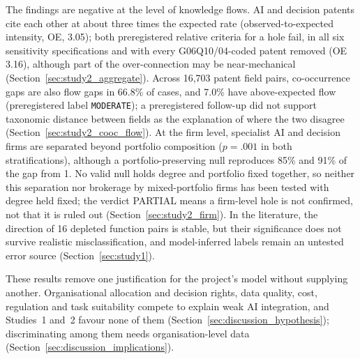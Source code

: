 The findings are negative at the level of knowledge flows. AI and decision patents cite each other at about three times the expected rate (observed-to-expected intensity, OE, 3.05); both preregistered relative criteria for a hole fail, in all six sensitivity specifications and with every G06Q10/04-coded patent removed (OE 3.16), although part of the over-connection may be near-mechanical (Section~\ref{sec:study2_aggregate}). Across 16,703 patent field pairs, co-occurrence gaps are also flow gaps in 66.8\% of cases, and 7.0\% have above-expected flow (preregistered label \texttt{MODERATE}); a preregistered follow-up did not support taxonomic distance between fields as the explanation of where the two disagree (Section~\ref{sec:study2_cooc_flow}). At the firm level, specialist AI and decision firms are separated beyond portfolio composition ($p = .001$ in both stratifications), although a portfolio-preserving null reproduces 85\% and 91\% of the gap from 1. No valid null holds degree and portfolio fixed together, so neither this separation nor brokerage by mixed-portfolio firms has been tested with degree held fixed; the verdict PARTIAL means a firm-level hole is not confirmed, not that it is ruled out (Section~\ref{sec:study2_firm}). In the literature, the direction of 16 depleted function pairs is stable, but their significance does not survive realistic misclassification, and model-inferred labels remain an untested error source (Section~\ref{sec:study1}).

These results remove one justification for the project's model without supplying another. Organisational allocation and decision rights, data quality, cost, regulation and task suitability compete to explain weak AI integration, and Studies~1 and~2 favour none of them (Section~\ref{sec:discussion_hypothesis}); discriminating among them needs organisation-level data (Section~\ref{sec:discussion_implications}).

